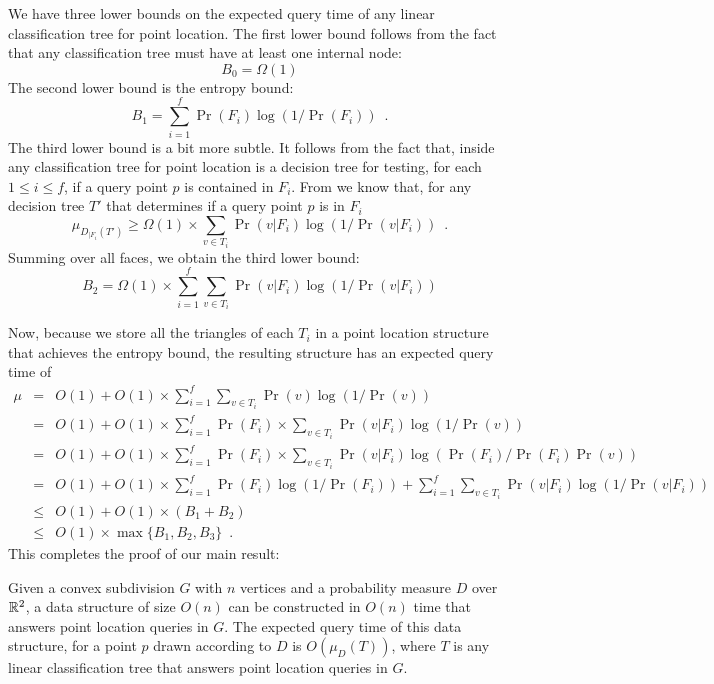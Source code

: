\documentclass[charterfonts,lotsofwhite]{patmorin}
\begin{document}
We have three lower bounds on the expected query time of any linear
classification tree for point location.  The first lower bound follows from
the fact that any classification tree must have at least one internal
node:
\[
    B_0 = \Omega(1)
\]
The second lower bound is the
entropy bound:
\[
	B_1 = \sum_{i=1}^f \Pr(F_i)\log(1/\Pr(F_i)) \enspace .
\]
The third lower bound is a bit more subtle.  It follows from the fact
that, inside any classification tree for point location is a decision
tree for testing, for each $1\le i\le f$, if a query point $p$ is
contained in $F_i$.  From  we know that, for any
decision tree $T'$ that determines if a query point $p$ is in $F_i$
\[
   \mu_{D_{|F_i}(T')} \ge \Omega(1)\times \sum_{v\in T_i}\Pr(v|F_i)\log(1/\Pr(v|F_i))
	\enspace .
\]
Summing over all faces, we obtain the third lower bound:
\[
   B_2 = \Omega(1)\times \sum_{i=1}^f \sum_{v\in T_i}\Pr(v|F_i)\log(1/\Pr(v|F_i))
\]

Now, because we store all the triangles of each $T_i$ in a point
location structure that achieves the entropy bound, the resulting
structure has an expected query time of 
\begin{eqnarray*}
\mu & = & O(1)+O(1)\times \sum_{i=1}^f \sum_{v\in T_i} \Pr(v)\log(1/\Pr(v)) \\
& = & O(1)+O(1)\times\sum_{i=1}^f \Pr(F_i)\times \sum_{v\in T_i} \Pr(v|F_{i})\log(1/\Pr(v)) \\
& = & O(1)+O(1)\times\sum_{i=1}^f \Pr(F_i)\times \sum_{v\in T_i}
	\Pr(v|F_{i})\log(\Pr(F_i)/\Pr(F_i)\Pr(v)) \\
& = & O(1)+O(1)\times\sum_{i=1}^f \Pr(F_i)\log (1/\Pr(F_i)) + 
        \sum_{i=1}^f \sum_{v\in T_i}
	\Pr(v|F_{i})\log(1/\Pr(v|F_i)) \\
& \le & O(1)+O(1)\times(B_1 + B_2) \\
& \le & O(1)\times \max\{B_1, B_2,B_3\} \enspace .
\end{eqnarray*}
This completes the proof of our main result:

\begin{thm}
Given a convex subdivision $G$ with $n$ vertices and a probability measure
$D$ over $\mathbb{R}^2$, a data structure of size
$O(n)$ can be constructed in $O(n)$ time that answers point location queries in 
$G$. 
The expected query time of this data structure, for a point $p$
drawn according to $D$ is $O(\mu_D(T))$, where $T$ is any linear
classification tree that answers point location queries in $G$.
\end{thm}
\end{document}
